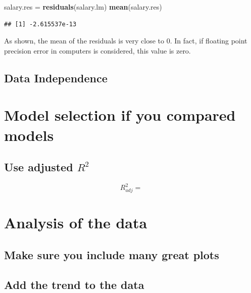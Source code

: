 \documentclass[]{article}
\newenvironment{Shaded}{\begin{snugshade}}{\end{snugshade}}
\newcommand{\KeywordTok}[1]{\textcolor[rgb]{0.13,0.29,0.53}{\textbf{#1}}}
\newcommand{\NormalTok}[1]{#1}
\newcommand{\StringTok}[1]{\textcolor[rgb]{0.31,0.60,0.02}{#1}}
\begin{document}
\begin{Shaded}
\begin{Highlighting}[]
\NormalTok{salary.res =}\StringTok{ }\KeywordTok{residuals}\NormalTok{(salary.lm)}
\KeywordTok{mean}\NormalTok{(salary.res)}
\end{Highlighting}
\end{Shaded}

\begin{verbatim}
## [1] -2.615537e-13
\end{verbatim}

As shown, the mean of the residuals is very close to 0. In fact, if
floating point precision error in computers is considered, this value is
zero.

\hypertarget{data-independence}{%
\subsection{Data Independence}\label{data-independence}}

\hypertarget{model-selection-if-you-compared-models}{%
\section{Model selection if you compared
models}\label{model-selection-if-you-compared-models}}

\hypertarget{use-adjusted-r2}{%
\subsection{\texorpdfstring{Use adjusted
\(R^2\)}{Use adjusted R\^{}2}}\label{use-adjusted-r2}}

\[R_{adj}^2 =\]

\hypertarget{analysis-of-the-data}{%
\section{Analysis of the data}\label{analysis-of-the-data}}

\hypertarget{make-sure-you-include-many-great-plots}{%
\subsection{Make sure you include many great
plots}\label{make-sure-you-include-many-great-plots}}

\hypertarget{add-the-trend-to-the-data}{%
\subsection{Add the trend to the data}\label{add-the-trend-to-the-data}}
\end{document}
